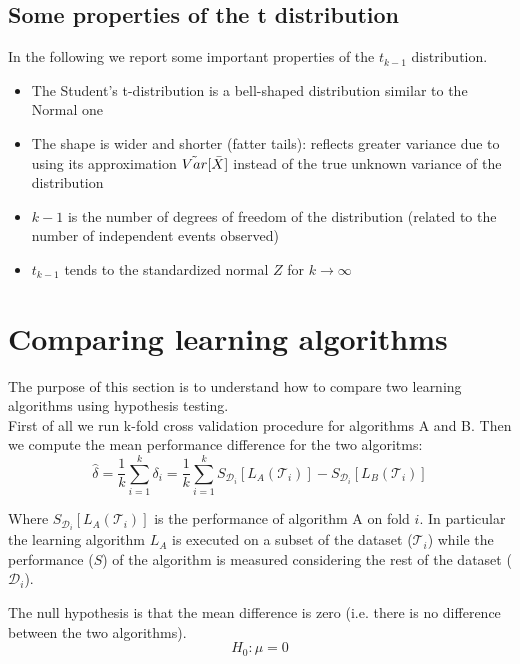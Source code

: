 \subsection{Some properties of the t distribution}
In the following we report some important properties of the $t_{k-1}$ distribution.
\begin{itemize}
	\item The Student's t-distribution is a bell-shaped distribution similar to the
		Normal one

	\item The shape is wider and shorter (fatter tails): reflects greater variance
		due to using its approximation $\tilde{Var}[\Bar{X}]$ instead of the true
		unknown variance of the distribution

	\item $k-1$ is the number of degrees of freedom of the distribution (related
		to the number of independent events observed)

	\item $t_{k-1}$ tends to the standardized normal $Z$ for $k \rightarrow \infty$
\end{itemize}

\section{Comparing learning algorithms}
The purpose of this section is to understand how to compare two learning algorithms
using hypothesis testing.\\ First of all we run k-fold cross validation procedure
for algorithms A and B. Then we compute the mean performance difference for the
two algoritms:
\begin{equation}
	\hat{\delta}= \frac{1}{k}\sum_{i=1}^{k}\delta_{i}= \frac{1}{k}\sum_{i=1}^{k}S_{\mathcal{D}_i}
	[L_{A}(\mathcal{T}_{i})] - S_{\mathcal{D}_i}[L_{B}(\mathcal{T}_{i})]
\end{equation}

Where $S_{\mathcal{D}_i}[L_{A}(\mathcal{T}_{i})]$ is the performance of
algorithm A on fold $i$. In particular the learning algorithm $L_{A}$ is executed
on a subset of the dataset ($\mathcal{T}_{i}$) while the performance ($S$) of the
algorithm is measured considering the rest of the dataset ($\mathcal{D}_{i}$).
\newline

The null hypothesis is that the mean difference is zero (i.e. there is no difference
between the two algorithms).
\[
	H_{0}: \mu = 0
\]

